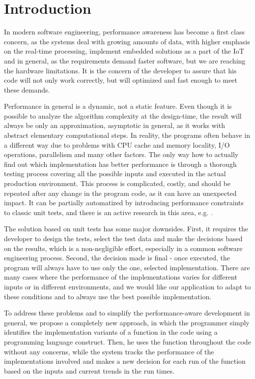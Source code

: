 \chapter*{Introduction}

In modern software engineering, performance awareness has become a first class concern, as the systems deal with growing amounts of data, with higher emphasis on the real-time processing, implement embedded solutions as a part of the IoT and in general, as the requirements demand faster software, but we are reaching the hardware limitations. It is the concern of the developer to assure that his code will not only work correctly, but will optimized and fast enough to meet these demands.

Performance in general is a dynamic, not a static feature. Even though it is possible to analyze the algorithm complexity at the design-time, the result will always be only an approximation, asymptotic in general, as it works with abstract elementary computational steps. In reality, the programs often behave in a different way due to problems with CPU cache and memory locality, I/O operations, parallelism and many other factors. The only way how to actually find out which implementation has better performance is through a thorough testing process covering all the possible inputs and executed in the actual production environment. This process is complicated, costly, and should be repeated after any change in the program code, as it can have an unexpected impact. It can be partially automatized by introducing performance constraints to classic unit tests, and there is an active research in this area, e.g. \cite{bulej_capturing_2012,horky_performance_2013,horky_utilizing_2015}.

The solution based on unit tests has some major downsides. First, it requires the developer to design the tests, select the test data and make the decisions based on the results, which is a non-negligible effort, especially in a common software engineering process. Second, the decision made is final - once executed, the program will always have to use only the one, selected implementation. There are many cases where the performance of the implementations varies for different inputs or in different environments, and we would like our application to adapt to these conditions and to always use the best possible implementation.

To address these problems and to simplify the performance-aware development in general, we propose a completely new approach, in which the programmer simply identifies the implementation variants of a function in the code using a programming language construct. Then, he uses the function throughout the code without any concerns, while the system tracks the performance of the implementations involved and makes a new decision for each run of the function based on the inputs and current trends in the run times.

